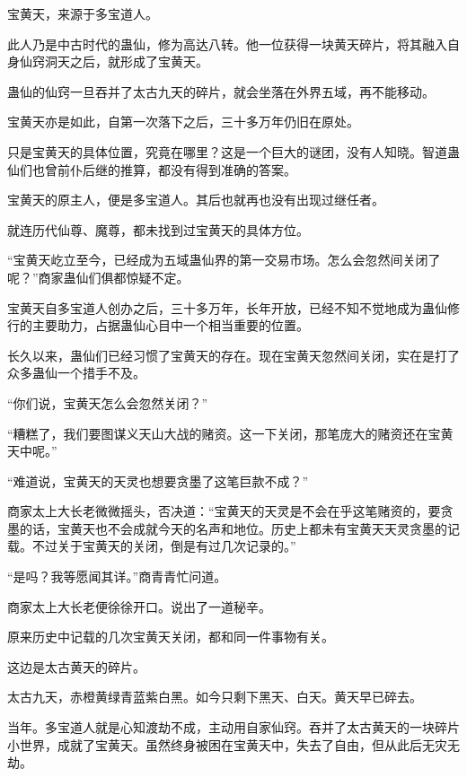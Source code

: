 
\begin{this_body}

宝黄天，来源于多宝道人。

此人乃是中古时代的蛊仙，修为高达八转。他一位获得一块黄天碎片，将其融入自身仙窍洞天之后，就形成了宝黄天。

蛊仙的仙窍一旦吞并了太古九天的碎片，就会坐落在外界五域，再不能移动。

宝黄天亦是如此，自第一次落下之后，三十多万年仍旧在原处。

只是宝黄天的具体位置，究竟在哪里？这是一个巨大的谜团，没有人知晓。智道蛊仙们也曾前仆后继的推算，都没有得到准确的答案。

宝黄天的原主人，便是多宝道人。其后也就再也没有出现过继任者。

就连历代仙尊、魔尊，都未找到过宝黄天的具体方位。

“宝黄天屹立至今，已经成为五域蛊仙界的第一交易市场。怎么会忽然间关闭了呢？”商家蛊仙们俱都惊疑不定。

宝黄天自多宝道人创办之后，三十多万年，长年开放，已经不知不觉地成为蛊仙修行的主要助力，占据蛊仙心目中一个相当重要的位置。

长久以来，蛊仙们已经习惯了宝黄天的存在。现在宝黄天忽然间关闭，实在是打了众多蛊仙一个措手不及。

“你们说，宝黄天怎么会忽然关闭？”

“糟糕了，我们要图谋义天山大战的赌资。这一下关闭，那笔庞大的赌资还在宝黄天中呢。”

“难道说，宝黄天的天灵也想要贪墨了这笔巨款不成？”

商家太上大长老微微摇头，否决道：“宝黄天的天灵是不会在乎这笔赌资的，要贪墨的话，宝黄天也不会成就今天的名声和地位。历史上都未有宝黄天天灵贪墨的记载。不过关于宝黄天的关闭，倒是有过几次记录的。”

“是吗？我等愿闻其详。”商青青忙问道。

商家太上大长老便徐徐开口。说出了一道秘辛。

原来历史中记载的几次宝黄天关闭，都和同一件事物有关。

这边是太古黄天的碎片。

太古九天，赤橙黄绿青蓝紫白黑。如今只剩下黑天、白天。黄天早已碎去。

当年。多宝道人就是心知渡劫不成，主动用自家仙窍。吞并了太古黄天的一块碎片小世界，成就了宝黄天。虽然终身被困在宝黄天中，失去了自由，但从此后无灾无劫。


\end{this_body}
